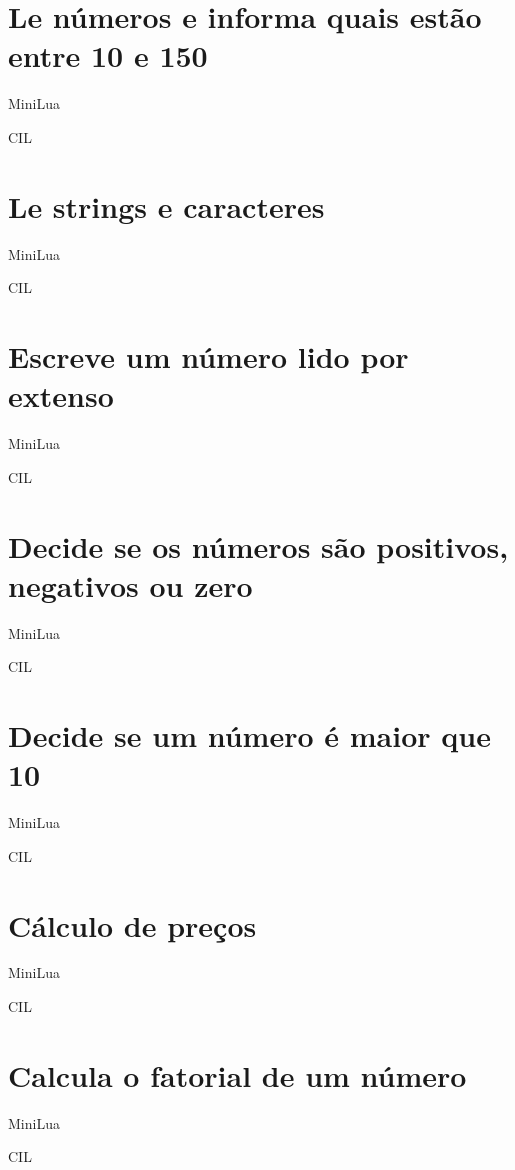 \documentclass[12pt,a4paper]{report}
\begin{document}
\section{Le números e informa quais estão entre 10 e 150 }
MiniLua

CIL




\section{Le strings e caracteres }
MiniLua

CIL




\section{Escreve um número lido por extenso }
MiniLua

CIL




\section{Decide se os números são positivos, negativos ou zero }
MiniLua

CIL




\section{Decide se um número é maior que 10 }
MiniLua

CIL




\section{Cálculo de preços}
MiniLua

CIL




\section{Calcula o fatorial de um número}
MiniLua

CIL

\end{document}
